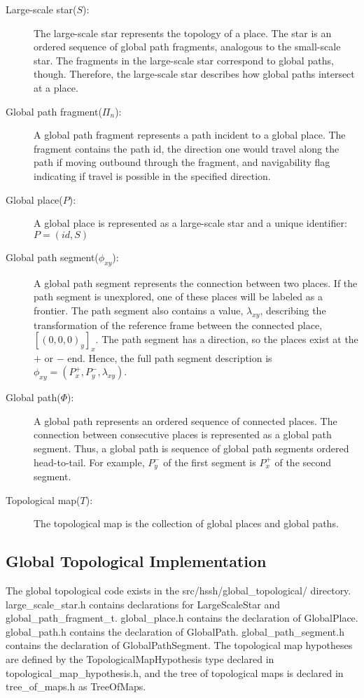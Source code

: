 \documentclass{article}
\begin{document}
\begin{description}
    \item[Large-scale star($S$):] The large-scale star represents the topology of a place. The star is an ordered
    sequence of global path fragments, analogous to the small-scale star. The fragments in the large-scale star
    correspond to global paths, though. Therefore, the large-scale star describes how global paths intersect at a place.
    
    \item[Global path fragment($\Pi_n$):] A global path fragment represents a path incident to a global place. The
    fragment contains the path id, the direction one would travel along the path if moving outbound through the
    fragment, and navigability flag indicating if travel is possible in the specified direction.
    
    \item[Global place($P$):] A global place is represented as a large-scale star and a unique identifier: $P = (id, S)$
    
    \item[Global path segment($\phi_{xy}$):] A global path segment represents the connection between two places. If the
    path segment is unexplored, one of these places will be labeled as a frontier. The path segment also contains a
    value, $\lambda_{xy}$, describing the transformation of the reference frame between the connected place,
    $[(0,0,0)_y]_x$. The path segment has a direction, so the places exist at the $+$ or $-$ end. Hence, the full path
    segment description is $\phi_{xy} = (P_x^+, P_y^-, \lambda_{xy})$.
    
    \item[Global path($\Phi$):] A global path represents an ordered sequence of connected places. The connection
    between consecutive places is represented as a global path segment. Thus, a global path is sequence of global path
    segments ordered head-to-tail. For example, $P_y^-$ of the first segment is $P_x^+$ of the second segment.
    
    \item[Topological map($T$):] The topological map is the collection of global places and global paths.
\end{description}

\subsection{Global Topological Implementation}
The global topological code exists in the src/hssh/global\_topological/ directory. large\_scale\_star.h contains
declarations for LargeScaleStar and global\_path\_fragment\_t. global\_place.h contains the declaration of GlobalPlace.
global\_path.h contains the declaration of GlobalPath. global\_path\_segment.h contains the declaration of
GlobalPathSegment. The topological map hypotheses are defined by the TopologicalMapHypothesis type declared in
topological\_map\_hypothesis.h, and the tree of topological maps is declared in tree\_of\_maps.h as TreeOfMaps.
\end{document}
